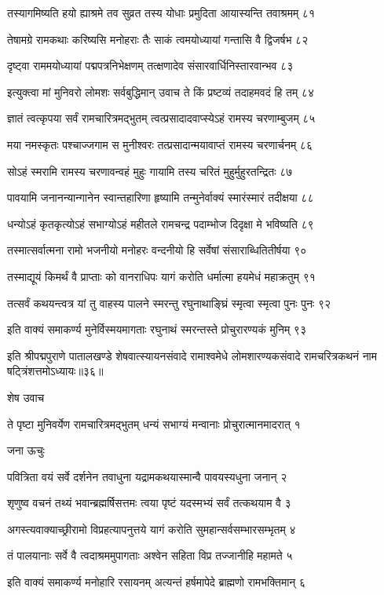 तस्यागमिष्यति हयो ह्याश्रमे तव सुव्रत
तस्य योधाः प्रमुदिता आयास्यन्ति तवाश्रमम् ८१

तेषामग्रे रामकथाः करिष्यसि मनोहराः
तैः साकं त्वमयोध्यायां गन्तासि वै द्विजर्षभ ८२

दृष्ट्वा राममयोध्यायां पद्मपत्रनिभेक्षणम्
तत्क्षणादेव संसारवार्धिनिस्तारवान्भव ८३

इत्युक्त्वा मां मुनिवरो लोमशः सर्वबुद्धिमान्
उवाच ते किं प्रष्टव्यं तदाहमवदं हि तम् ८४

ज्ञातं त्वत्कृपया सर्वं रामचारित्रमद्भुतम्
त्वत्प्रसादादवाप्स्येऽहं रामस्य चरणाम्बुजम् ८५

मया नमस्कृतः पश्चाज्जगाम स मुनीश्वरः
तत्प्रसादान्मयावाप्तं रामस्य चरणार्चनम् ८६

सोऽहं स्मरामि रामस्य चरणावन्वहं मुहुः
गायामि तस्य चरितं मुहुर्मुहुरतन्द्रितः ८७

पावयामि जनानन्यान्गानेन स्वान्तहारिणा
हृष्यामि तन्मुनेर्वाक्यं स्मारंस्मारं तदीक्षया ८८

धन्योऽहं कृतकृत्योऽहं सभाग्योऽहं महीतले
रामचन्द्र पदाम्भोज दिदृक्षा मे भविष्यति ८९

तस्मात्सर्वात्मना रामो भजनीयो मनोहरः
वन्दनीयो हि सर्वेषां संसाराब्धितितीर्षया ९०

तस्माद्यूयं किमर्थं वै प्राप्ताः को वानराधिपः
यागं करोति धर्मात्मा हयमेधं महाक्रतुम् ९१

तत्सर्वं कथयन्त्वत्र यां तु वाहस्य पालने
स्मरन्तु रघुनाथाङ्घ्रिं स्मृत्वा स्मृत्वा पुनः पुनः ९२

इति वाक्यं समाकर्ण्य मुनेर्विस्मयमागताः
रघुनाथं स्मरन्तस्ते प्रोचुरारण्यकं मुनिम् ९३

इति श्रीपद्मपुराणे पातालखण्डे शेषवात्स्यायनसंवादे रामाश्वमेधे लोमशारण्यकसंवादे रामचरित्रकथनं नाम षट्त्रिंशत्तमोऽध्यायः॥३६॥


शेष उवाच

ते पृष्टा मुनिवर्येण रामचारित्रमद्भुतम्
धन्यं सभाग्यं मन्वानाः प्रोचुरात्मानमादरात् १

जना ऊचुः

पवित्रिता वयं सर्वे दर्शनेन तवाधुना
यद्रामकथयास्मान्वै पावयस्यधुना जनान् २

शृणुष्व वचनं तथ्यं भवान्ब्रह्मर्षिसत्तमः
त्वया पृष्टं यदस्मभ्यं सर्वं तत्कथयाम वै ३

अगस्त्यवाक्याच्छ्रीरामो विप्रहत्यापनुत्तये
यागं करोति सुमहान्सर्वसम्भारसम्भृतम् ४

तं पालयानाः सर्वे वै त्वदाश्रममुपागताः
अश्वेन सहिता विप्र तज्जानीहि महामते ५

इति वाक्यं समाकर्ण्य मनोहारि रसायनम्
अत्यन्तं हर्षमापेदे ब्राह्मणो रामभक्तिमान् ६

